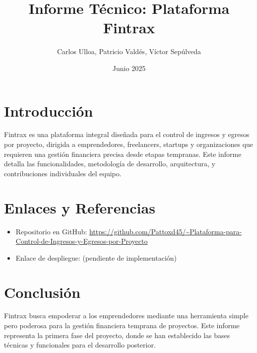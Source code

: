 \documentclass[12pt, a4paper]{article}
\title{Informe Técnico: Plataforma Fintrax}
\author{Carlos Ulloa, Patricio Valdés, Víctor Sepúlveda}
\date{Junio 2025}
\begin{document}
\maketitle
\newpage
\section{Introducción}
Fintrax es una plataforma integral diseñada para el control de ingresos y egresos por proyecto, dirigida a emprendedores, freelancers, startups y organizaciones que requieren una gestión financiera precisa desde etapas tempranas. Este informe detalla las funcionalidades, metodología de desarrollo, arquitectura, y contribuciones individuales del equipo.
\newpage
% 
% 

\section{Enlaces y Referencias}
\begin{itemize}
    \item Repositorio en GitHub: \url{https://github.com/Pattoxd45/~Plataforma-para-Control-de-Ingresos-y-Egresos-por-Proyecto}
    \item Enlace de despliegue: (pendiente de implementación)
\end{itemize}

\section{Conclusión}
Fintrax busca empoderar a los emprendedores mediante una herramienta simple pero poderosa para la gestión financiera temprana de proyectos. Este informe representa la primera fase del proyecto, donde se han establecido las bases técnicas y funcionales para el desarrollo posterior.
\end{document}
